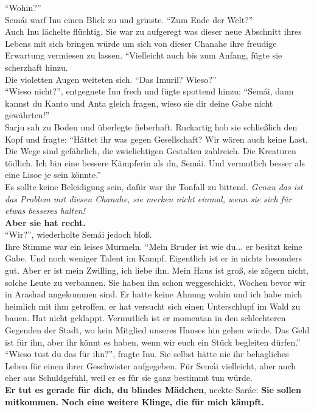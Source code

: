 ``Wohin?''\\
Semái warf Inu einen Blick zu und grinste. ``Zum Ende der Welt?''\\
Auch Inu lächelte flüchtig. Sie war zu aufgeregt was dieser neue Abschnitt ihres Lebens mit sich 
bringen würde um sich von dieser Chanahe ihre freudige Erwartung vermiesen zu lassen. ``Vielleicht 
auch bis zum Anfang, fügte sie scherzhaft hinzu.\\
Die violetten Augen weiteten sich. ``Das Imuril? Wieso?''\\
``Wieso nicht?'', entgegnete Inu frech und fügte spottend hinzu: ``Semái, dann kannst du Kanto und 
Anta gleich fragen, wieso sie dir deine Gabe nicht gewährten!''\\
Sarju sah zu Boden und überlegte fieberhaft. Ruckartig hob sie schließlich den Kopf und fragte: 
``Hättet ihr was gegen Gesellschaft? Wir wären auch keine Last. Die Wege sind gefährlich, die 
zwielichtigen Gestalten zahlreich. Die Kreaturen tödlich. Ich bin eine bessere Kämpferin als du, 
Semái. Und vermutlich besser als eine Lisoe je sein könnte.''\\
Es sollte keine Beleidigung sein, dafür war ihr Tonfall zu bittend. \textit{Genau das ist das 
Problem mit diesen Chanahe, sie merken nicht einmal, wenn sie sich für etwas besseres halten!}\\
\textbf{Aber sie hat recht.}\\
``Wir?'', wiederholte Semái jedoch bloß.\\
Ihre Stimme war ein leises Murmeln. ``Mein Bruder ist wie du... er besitzt keine Gabe. Und noch 
weniger Talent im Kampf. Eigentlich ist er in nichts besonders gut. Aber er ist mein Zwilling, ich 
liebe ihn. Mein Haus ist groß, sie zögern nicht, solche Leute zu verbannen. Sie haben ihn schon 
weggeschickt, Wochen bevor wir in Arashad angekommen sind. Er hatte keine Ahnung wohin und ich habe 
mich heimlich mit ihm getroffen, er hat versucht sich einen Unterschlupf im Wald zu bauen. Hat 
nicht geklappt. Vermutlich ist er momentan in den schlechteren Gegenden der Stadt, wo kein 
Mitglied unseres Hauses hin gehen würde. Das Geld ist für ihn, aber ihr könnt es haben, wenn wir 
euch ein Stück begleiten dürfen.''\\
``Wieso tust du das für ihn?'', fragte Inu. Sie selbst hätte nie ihr behagliches Leben für einen 
ihrer Geschwister aufgegeben. Für Semái vielleicht, aber auch eher aus Schuldgefühl, weil er es für 
sie ganz bestimmt tun würde. \\
\textbf{Er tut es gerade für dich, du blindes Mädchen}, neckte Saráe: \textbf{Sie sollen mitkommen. 
Noch eine weitere Klinge, die für mich kämpft.}\\
